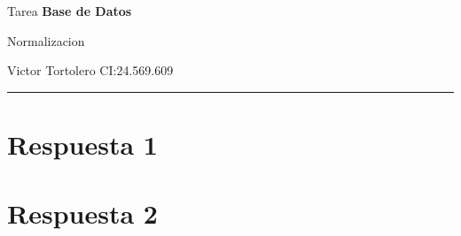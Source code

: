 \documentclass{article}
\begin{document}
\flushleft
\setlength{\parindent}{20pt}

\justify
\centerline{\huge Tarea \textbf{Base de Datos}}
\centerline{\Large Normalizacion}
\centerline{Victor Tortolero CI:24.569.609}  %
\vspace{0.1cm}
\hrule

\section*{Respuesta 1}

\newpage

\section*{Respuesta 2}

\newpage
\end{document}
